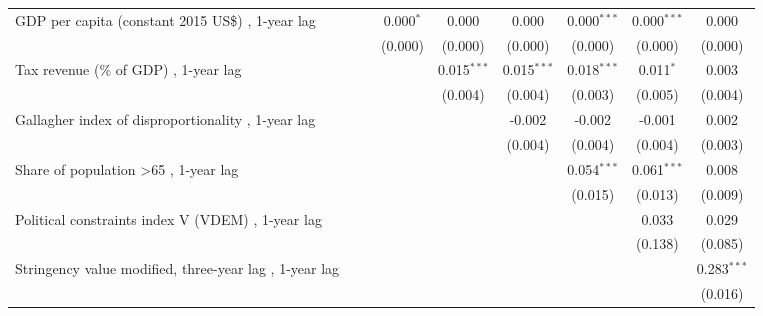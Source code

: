 \begin{table}[htbp]
\begin{tabular}{lcccccccc}
      GDP per capita (constant 2015 US\$) , 1-year lag                        &         &         & 0.000$^{*}$ & 0.000         & 0.000         & 0.000$^{***}$ & 0.000$^{***}$ & 0.000\\   
                                                                              &         &         & (0.000)     & (0.000)       & (0.000)       & (0.000)       & (0.000)       & (0.000)\\   
      Tax revenue (\% of GDP) , 1-year lag                                    &         &         &             & 0.015$^{***}$ & 0.015$^{***}$ & 0.018$^{***}$ & 0.011$^{*}$   & 0.003\\   
                                                                              &         &         &             & (0.004)       & (0.004)       & (0.003)       & (0.005)       & (0.004)\\   
      Gallagher index of disproportionality , 1-year lag                      &         &         &             &               & -0.002        & -0.002        & -0.001        & 0.002\\   
                                                                              &         &         &             &               & (0.004)       & (0.004)       & (0.004)       & (0.003)\\   
      Share of population >65 , 1-year lag                                    &         &         &             &               &               & 0.054$^{***}$ & 0.061$^{***}$ & 0.008\\   
                                                                              &         &         &             &               &               & (0.015)       & (0.013)       & (0.009)\\   
      Political constraints index V (VDEM) , 1-year lag                       &         &         &             &               &               &               & 0.033         & 0.029\\   
                                                                              &         &         &             &               &               &               & (0.138)       & (0.085)\\   
      Stringency value modified, three-year lag , 1-year lag                  &         &         &             &               &               &               &               & 0.283$^{***}$\\   
                                                                              &         &         &             &               &               &               &               & (0.016)\\   

\end{tabular}
\end{table}

